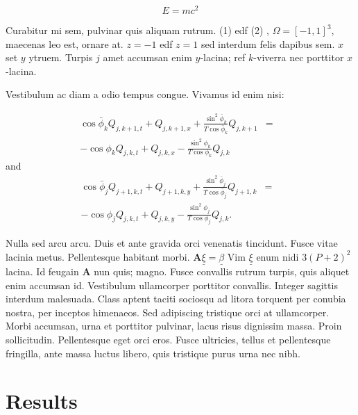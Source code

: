 \documentclass[a0,landscape]{a0poster}
\begin{document}
\begin{multicols}{4}
\begin{equation}
E = mc^{2}
\label{eqn:Einstein}
\end{equation}

Curabitur mi sem, pulvinar quis aliquam rutrum. (1) edf (2)
, $\Omega=[-1,1]^3$, maecenas leo est, ornare at. $z=-1$ edf $z=1$ sed interdum felis dapibus sem. $x$ set $y$ ytruem. 
Turpis $j$ amet accumsan enim $y$-lacina; 
ref $k$-viverra nec porttitor $x$-lacina. 

Vestibulum ac diam a odio tempus congue. Vivamus id enim nisi:

\begin{eqnarray}
\cos\bar{\phi}_k Q_{j,k+1,t} + Q_{j,k+1,x}+\frac{\sin^2\bar{\phi}_k}{T\cos\bar{\phi}_k} Q_{j,k+1} &=&\nonumber\\ 
-\cos\phi_k Q_{j,k,t} + Q_{j,k,x}-\frac{\sin^2\phi_k}{T\cos\phi_k} Q_{j,k}\label{edgek}
\end{eqnarray}
and
\begin{eqnarray}
\cos\bar{\phi}_j Q_{j+1,k,t} + Q_{j+1,k,y}+\frac{\sin^2\bar{\phi}_j}{T\cos\bar{\phi}_j} Q_{j+1,k}&=&\nonumber \\
-\cos\phi_j Q_{j,k,t} + Q_{j,k,y}-\frac{\sin^2\phi_j}{T\cos\phi_j} Q_{j,k}.\label{edgej}
\end{eqnarray} 

Nulla sed arcu arcu. Duis et ante gravida orci venenatis tincidunt. Fusce vitae lacinia metus. Pellentesque habitant morbi. $\mathbf{A}\underline{\xi}=\underline{\beta}$ Vim $\underline{\xi}$ enum nidi $3(P+2)^{2}$ lacina. Id feugain $\mathbf{A}$ nun quis; magno. Fusce convallis rutrum turpis, quis aliquet enim accumsan id. Vestibulum ullamcorper porttitor convallis. Integer sagittis interdum malesuada. Class aptent taciti sociosqu ad litora torquent per conubia nostra, per inceptos himenaeos. Sed adipiscing tristique orci at ullamcorper. Morbi accumsan, urna et porttitor pulvinar, lacus risus dignissim massa. Proin sollicitudin. Pellentesque eget orci eros. Fusce ultricies, tellus et pellentesque fringilla, ante massa luctus libero, quis tristique purus urna nec nibh.


\section*{Results}


\end{multicols}
\end{document}

